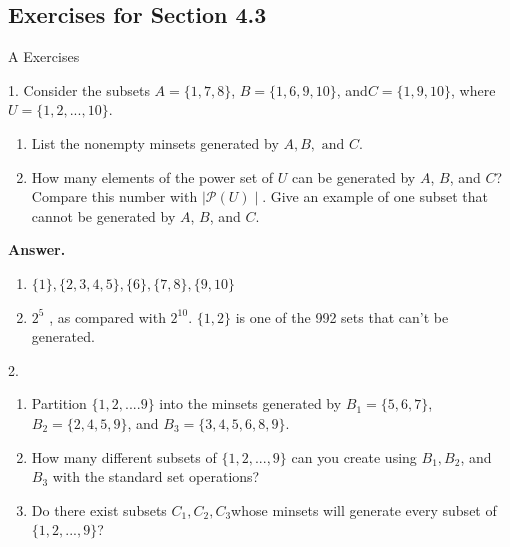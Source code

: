 \documentclass[10pt,]{book}
\theoremstyle{plain}
\theoremstyle{definition}
\theoremstyle{definition}
\theoremstyle{definition}
\begin{document}
\subsection[Exercises for Section 4.3 ]{Exercises for Section 4.3 }\label{exercises-4-3}
\hypertarget{exercisegroup-5}{}\typeout{************************************************}
\typeout{************************************************}
A Exercises%
\begin{exercisegroup}
\item[1.]\hypertarget{exercise-12}{}Consider the subsets \(A = \{1, 7, 8\}\), \(B = \{1, 6, 9, 10\}\), and\(C = \{1, 9, 10\}\), where \(U = \{1,2, . . . , 10\}\).%
\par
\leavevmode%
\begin{enumerate}[label=\alph*]
\item\hypertarget{li-54}{}List the nonempty minsets generated by \(A, B, \textrm{ and } C\).%
\item\hypertarget{li-55}{}How many elements of the power set of \(U\) can be generated by \(A\), \(B\), and \(C\)? Compare this number with \(\mid\mathcal{P}(U)\mid\).  Give an example of one subset that cannot be generated by \(A\), \(B\), and \(C\).%
\end{enumerate}
%
\par\smallskip
\par\smallskip
\noindent\textbf{Answer.}\hypertarget{answer-6}{}\quad
\leavevmode%
\begin{enumerate}[label=\alph*]
\item\hypertarget{li-56}{} \(\{1\}, \{2, 3, 4, 5\}, \{6\}, \{7, 8\}, \{9, 10\}\)   %
\item\hypertarget{li-57}{} \(2^5\) , as compared with \(2^{10}\).   \(\{1, 2\}\) is one of the 992 sets that can't be generated. %
\end{enumerate}
%
\item[2.]\hypertarget{exercise-13}{}\leavevmode%
\begin{enumerate}[label=\alph*]
\item\hypertarget{li-58}{}Partition \(\{1, 2, .... 9\}\) into the minsets generated by \(B_1= \{5, 6,7\}\), \(B_2 = \{2, 4, 5, 9\}\), and \(B_3 = \{3, 4, 5, 6, 8, 9\}\).%
\item\hypertarget{li-59}{}How many different subsets of \(\{1, 2, . . . ,9\}\) can you create using \(B_1, B_2\), and \(B_3\) with the standard set operations?%
\item\hypertarget{li-60}{}Do there exist subsets \(C_1,C_2,C_3\)whose minsets will generate every subset of \(\{1,2, . . . ,9\}\)?%

\end{enumerate}
\end{exercisegroup}
\end{document}
